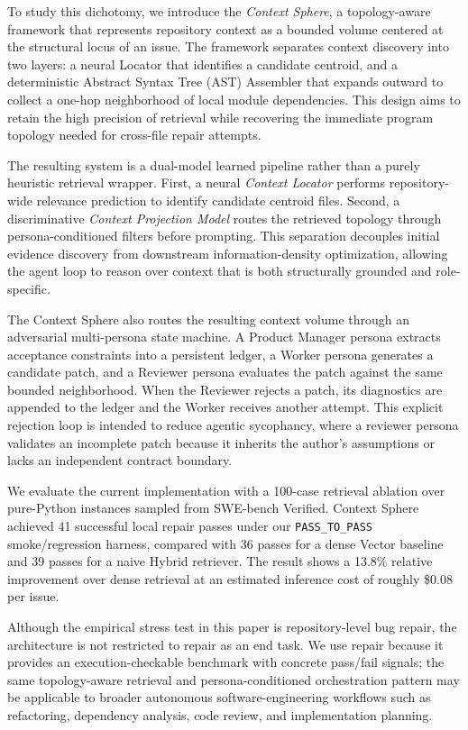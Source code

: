 To study this dichotomy, we introduce the \textit{Context Sphere}, a topology-aware framework that represents repository context as a bounded volume centered at the structural locus of an issue. The framework separates context discovery into two layers: a neural Locator that identifies a candidate centroid, and a deterministic Abstract Syntax Tree (AST) Assembler that expands outward to collect a one-hop neighborhood of local module dependencies. This design aims to retain the high precision of retrieval while recovering the immediate program topology needed for cross-file repair attempts.

The resulting system is a dual-model learned pipeline rather than a purely heuristic retrieval wrapper. First, a neural \textit{Context Locator} performs repository-wide relevance prediction to identify candidate centroid files. Second, a discriminative \textit{Context Projection Model} routes the retrieved topology through persona-conditioned filters before prompting. This separation decouples initial evidence discovery from downstream information-density optimization, allowing the agent loop to reason over context that is both structurally grounded and role-specific.

The Context Sphere also routes the resulting context volume through an adversarial multi-persona state machine. A Product Manager persona extracts acceptance constraints into a persistent ledger, a Worker persona generates a candidate patch, and a Reviewer persona evaluates the patch against the same bounded neighborhood. When the Reviewer rejects a patch, its diagnostics are appended to the ledger and the Worker receives another attempt. This explicit rejection loop is intended to reduce agentic sycophancy, where a reviewer persona validates an incomplete patch because it inherits the author's assumptions or lacks an independent contract boundary.

We evaluate the current implementation with a 100-case retrieval ablation over pure-Python instances sampled from SWE-bench Verified. Context Sphere achieved 41 successful local repair passes under our \texttt{PASS\_TO\_PASS} smoke/regression harness, compared with 36 passes for a dense Vector baseline and 39 passes for a naive Hybrid retriever. The result shows a 13.8\% relative improvement over dense retrieval at an estimated inference cost of roughly \$0.08 per issue.

Although the empirical stress test in this paper is repository-level bug repair, the architecture is not restricted to repair as an end task. We use repair because it provides an execution-checkable benchmark with concrete pass/fail signals; the same topology-aware retrieval and persona-conditioned orchestration pattern may be applicable to broader autonomous software-engineering workflows such as refactoring, dependency analysis, code review, and implementation planning.


